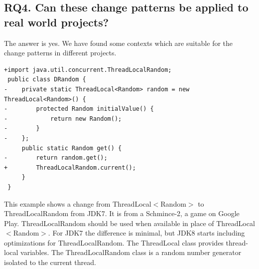 
\subsection{RQ4. Can these change patterns be applied to real world projects?}
\label{sec:result:sample}
The answer is yes. We have found some contexts which are suitable for the change patterns in different projects.

\begin{lstlisting}
+import java.util.concurrent.ThreadLocalRandom;
 public class DRandom {
-    private static ThreadLocal<Random> random = new ThreadLocal<Random>() {
-        protected Random initialValue() {
-            return new Random();
-        }
-    };
     public static Random get() {
-        return random.get();
+        ThreadLocalRandom.current();
     }
 }
\end{lstlisting}

This example shows a change from ThreadLocal$<$Random$>$ to ThreadLocalRandom from JDK7. It is from a Schmince-2, a game on Google Play. ThreadLocalRandom should be used when available in place of ThreadLocal$<$Random$>$. For JDK7 the difference is minimal, but JDK8 starts including optimizations for ThreadLocalRandom. The ThreadLocal class provides thread-local variables. The ThreadLocalRandom class is a random number generator isolated to the current thread.

